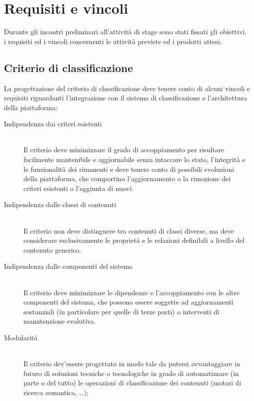 \section{Requisiti e vincoli}
\label{sec:tesi:progetto:requisiti}
Durante gli incontri preliminari all'attività di stage sono stati fissati gli obiettivi, i requisiti ed i vincoli concernenti le attività previste ed i prodotti attesi. 

\subsection{Criterio di classificazione}
\label{sec:tesi:progetto:requisiti:criterio-classificazione}
La progettazione del criterio di classificazione deve tenere conto di alcuni vincoli e requisiti riguardanti l'integrazione con il sistema di classificazione e l'architettura della piattaforma:

\begin{description}
	\item[Indipendenza dai criteri esistenti] \hfill \\
	Il criterio deve minimizzare il grado di accoppiamento per risultare facilmente mantenibile e aggiornabile senza intaccare lo stato, l'integrità e le funzionalità dei rimanenti e deve tenere conto di possibili evoluzioni della piattaforma, che comportino l'aggiornamento o la rimozione dei criteri esistenti o l'aggiunta di nuovi.
	\item[Indipendenza dalle classi di contenuti] \hfill \\
	Il criterio non deve distinguere tra contenuti di classi diverse, ma deve considerare esclusivamente le proprietà e le relazioni definibili a livello del contenuto generico.
	\item[Indipendenza dalle componenti del sistema] \hfill \\
	Il criterio deve minimizzare le dipendenze e l'accoppiamento con le altre componenti del sistema, che possono essere soggette ad aggiornamenti sostanziali (in particolare per quelle di terze parti) o interventi di manutenzione evolutiva.
	\item[Modularità] \hfill \\
	Il criterio dev'essere progettato in modo tale da potersi avvantaggiare in futuro di soluzioni tecniche o tecnologiche in grado di automatizzare (in parte o del tutto) le operazioni di classificazione dei contenuti (motori di ricerca semantica, \ldots);
\end{description}

